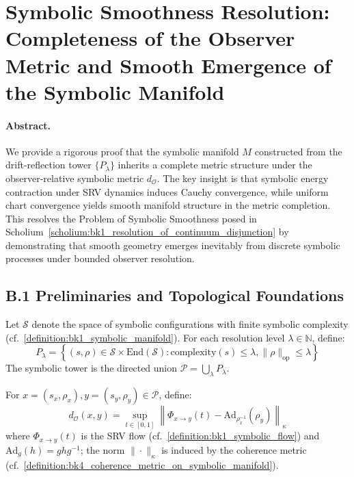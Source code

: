\section*{Symbolic Smoothness Resolution: Completeness of the Observer Metric and Smooth Emergence of the Symbolic Manifold}
\label{sec:appB_symbolic_smoothness_resolution}

\paragraph{Abstract.} We provide a rigorous proof that the symbolic manifold $M$ constructed from the drift-reflection tower $\{P_\lambda\}$ inherits a complete metric structure under the observer-relative symbolic metric $d_{\mathcal{O}}$. The key insight is that symbolic energy contraction under SRV dynamics induces Cauchy convergence, while uniform chart convergence yields smooth manifold structure in the metric completion. This resolves the Problem of Symbolic Smoothness posed in Scholium~\ref{scholium:bk1_resolution_of_continuum_disjunction} by demonstrating that smooth geometry emerges inevitably from discrete symbolic processes under bounded observer resolution.

\subsection*{B.1 Preliminaries and Topological Foundations}
\label{subsec:appB_preliminaries}

\begin{definition}
\label{definition:appB_symbolic_state_space}
Let $\mathcal{S}$ denote the space of symbolic configurations with finite symbolic complexity (cf.~\ref{definition:bk1_symbolic_manifold}). For each resolution level $\lambda \in \mathbb{N}$, define:
\[
P_\lambda = \left\{(s, \rho) \in \mathcal{S} \times \text{End}(\mathcal{S}) : \text{complexity}(s) \leq \lambda, \|\rho\|_{\text{op}} \leq \lambda \right\}
\]
The symbolic tower is the directed union $\mathcal{P} = \bigcup_{\lambda} P_\lambda$.
\end{definition}

\begin{definition}
\label{definition:appB_observer_metric}
For $x = (s_x, \rho_x), y = (s_y, \rho_y) \in \mathcal{P}$, define:
\[
d_{\mathcal{O}}(x,y) = \sup_{t \in [0,1]} \left\| \Phi_{x \to y}(t) - \text{Ad}_{\rho_x^{-1}}(\rho_y) \right\|_{\kappa}
\]
where $\Phi_{x \to y}(t)$ is the SRV flow (cf.~\ref{definition:bk1_symbolic_flow}) and $\text{Ad}_g(h) = g h g^{-1}$; the norm $\|\cdot\|_\kappa$ is induced by the coherence metric (cf.~\ref{definition:bk4_coherence_metric_on_symbolic_manifold}).
\end{definition}

